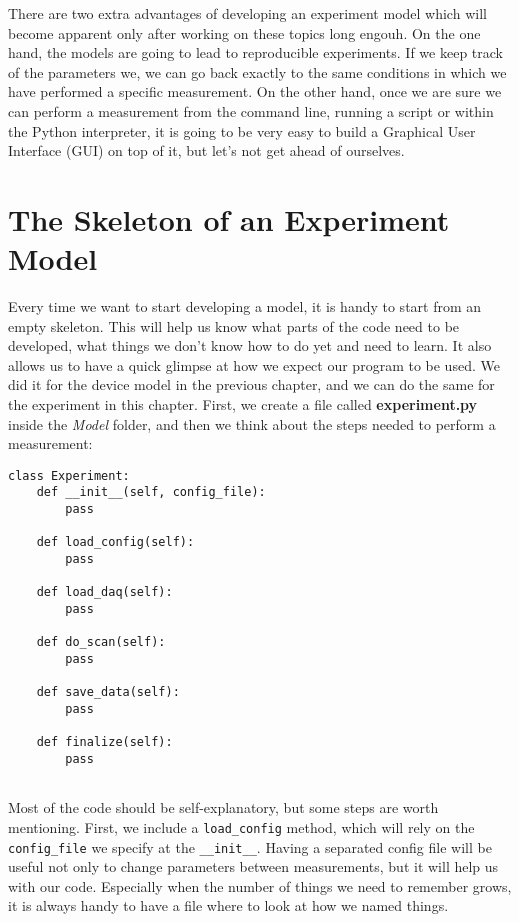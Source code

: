 There are two extra advantages of developing an experiment model which will become apparent only after working on these topics long engouh. On the one hand, the models are going to lead to reproducible experiments. If we keep track of the parameters we, we can go back exactly to the same conditions in which we have performed a specific measurement. On the other hand, once we are sure we can perform a measurement from the command line, running a script or within the Python interpreter, it is going to be very easy to build a Graphical User Interface ({GUI}) on top of it, but let's not get ahead of ourselves.

\section{The Skeleton of an Experiment Model}\label{section:skeleton-experiment-model}
Every time we want to start developing a model, it is handy to start from an empty skeleton. This will help us know what parts of the code need to be developed, what things we don't know how to do yet and need to learn. It also allows us to have a quick glimpse at how we expect our program to be used. We did it for the device model in the previous chapter, and we can do the same for the experiment in this chapter. First, we create a file called \textbf{experiment.py} inside the \emph{Model} folder, and then we think about the steps needed to perform a measurement:

\begin{verbatim}
class Experiment:
    def __init__(self, config_file):
        pass

    def load_config(self): 
        pass

    def load_daq(self):
        pass

    def do_scan(self):
        pass
        
    def save_data(self):
        pass
        
    def finalize(self):
        pass
            
\end{verbatim}

Most of the code should be self-explanatory, but some steps are worth mentioning. First, we include a \texttt{load\_config} method, which will rely on the \texttt{config\_file} we specify at the \texttt{\_\_init\_\_}. Having a separated config file will be useful not only to change parameters between measurements, but it will help us with our code. Especially when the number of things we need to remember grows, it is always handy to have a file where to look at how we named things. 

